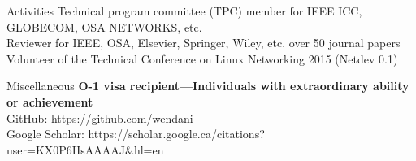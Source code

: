 \documentclass{resume} %
\begin{document}
\begin{rSection}{Activities}
Technical program committee (TPC) member for IEEE ICC, GLOBECOM, OSA NETWORKS, etc. \\
Reviewer for IEEE, OSA, Elsevier, Springer, Wiley, etc. over 50 journal papers\\
Volunteer of the Technical Conference on Linux Networking 2015 (Netdev 0.1)
\end{rSection}



\begin{rSection}{Miscellaneous}
\textbf{O-1 visa recipient---Individuals with extraordinary ability or achievement}\\
GitHub: https://github.com/wendani \\
Google Scholar: https://scholar.google.ca/citations?user=KX0P6HsAAAAJ\&hl=en
\end{rSection}
\end{document}
